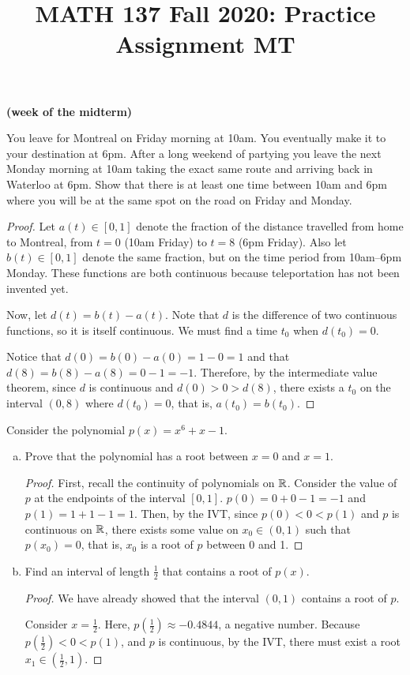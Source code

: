 \documentclass{agony}
\title{MATH 137 Fall 2020: Practice Assignment MT}
\begin{document}
\thispagestyle{firstpage}

\textbf{\thetitle{} (week of the midterm)}

\question You leave for Montreal on Friday morning at 10am.
You eventually make it to your destination at 6pm.
After a long weekend of partying you leave the next Monday morning at 10am taking the exact same route and arriving back in Waterloo at 6pm.
Show that there is at least one time between 10am and 6pm where you will be at the same spot on the road on Friday and Monday.

\begin{proof}
  Let $a(t) \in [0,1]$ denote the fraction of the distance travelled from home to Montreal,
  from $t=0$ (10am Friday) to $t=8$ (6pm Friday).
  Also let $b(t) \in [0,1]$ denote the same fraction, but on the time period from 10am--6pm Monday.
  These functions are both continuous because teleportation has not been invented yet.

  Now, let $d(t) = b(t) - a(t)$.
  Note that $d$ is the difference of two continuous functions, so it is itself continuous.
  We must find a time $t_0$ when $d(t_0) = 0$.

  Notice that $d(0) = b(0) - a(0) = 1 - 0 = 1$ and that $d(8) = b(8) - a(8) = 0 - 1 = -1$.
  Therefore, by the intermediate value theorem, since $d$ is continuous and $d(0) > 0 > d(8)$,
  there exists a $t_0$ on the interval $(0,8)$ where $d(t_0) = 0$, that is, $a(t_0) = b(t_0)$.
\end{proof}

\question Consider the polynomial $p(x)=x^6+x-1$.
\begin{enumerate}[(a)]
  \item Prove that the polynomial has a root between $x=0$ and $x=1$.
        \begin{proof}
          First, recall the continuity of polynomials on $\mathbb{R}$.
          Consider the value of $p$ at the endpoints of the interval $[0,1]$.
          $p(0) = 0+0-1 = -1$ and $p(1) = 1+1-1 = 1$.
          Then, by the IVT, since $p(0) < 0 < p(1)$ and $p$ is continuous on $\mathbb{R}$,
          there exists some value on $x_0\in(0,1)$ such that $p(x_0)=0$, that is,
          $x_0$ is a root of $p$ between 0 and 1.
        \end{proof}
  \item Find an interval of length $\frac{1}{2}$ that contains a root of $p(x)$.
        \begin{proof}
          We have already showed that the interval $(0,1)$ contains a root of $p$.

          Consider $x=\frac12$. Here, $p(\frac12)\approx-0.4844$, a negative number.
          Because $p(\frac12) < 0 < p(1)$, and $p$ is continuous, by the IVT,
          there must exist a root $x_1\in(\frac12,1)$.
        \end{proof}
\end{enumerate}
\end{document}
